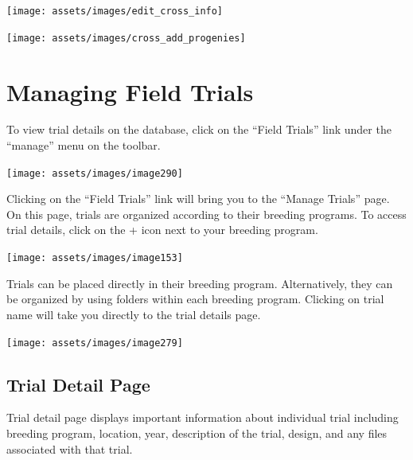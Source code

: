 \documentclass[
  12pt,
]{book}
\begin{document}
\begin{center}\texttt{[image: assets/images/edit\_cross\_info]} \end{center}

\begin{center}\texttt{[image: assets/images/cross\_add\_progenies]} \end{center}

\hypertarget{managing-field-trials}{%
\chapter{Managing Field Trials}\label{managing-field-trials}}

To view trial details on the database, click on the ``Field Trials'' link under the ``manage'' menu on the toolbar.

\begin{center}\texttt{[image: assets/images/image290]} \end{center}

Clicking on the ``Field Trials'' link will bring you to the ``Manage Trials'' page. On this page, trials are organized according to their breeding programs. To access trial details, click on the + icon next to your breeding program.

\begin{center}\texttt{[image: assets/images/image153]} \end{center}

Trials can be placed directly in their breeding program. Alternatively, they can be organized by using folders within each breeding program. Clicking on trial name will take you directly to the trial details page.

\begin{center}\texttt{[image: assets/images/image279]} \end{center}

\hypertarget{trial-detail-page}{%
\section{Trial Detail Page}\label{trial-detail-page}}

Trial detail page displays important information about individual trial including breeding program, location, year, description of the trial, design, and any files associated with that trial.
\end{document}
